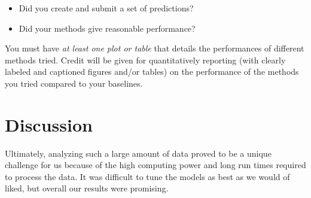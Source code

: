 \documentclass[11pt]{article}
\begin{document}
\begin{itemize}
\item Did you create and submit a set of
  predictions? 
  

\item  Did your methods give reasonable performance?  
\end{itemize}

\noindent You must have \textit{at least one plot or table}
that details the performances of different methods tried. 
Credit will be given for quantitatively reporting (with clearly
labeled and captioned figures and/or tables) on the performance of the
methods you tried compared to your baselines.








\section{Discussion} 

Ultimately, analyzing such a large amount of data proved to be a unique challenge for us because of the high computing power and long run times required to process the data. It was difficult to tune the models as best as we would of liked, but overall our results were promising.
 
\end{document}
